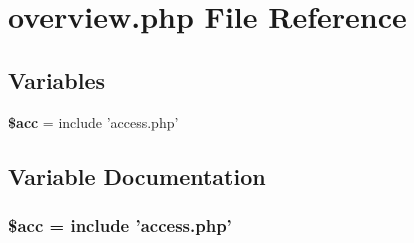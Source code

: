\section{overview.php File Reference}
\label{overview_8php}


\subsection*{Variables}
\begin{CompactItemize}
\item 
{\bf \$acc} = include 'access.php'
\end{CompactItemize}


\subsection{Variable Documentation}
\subsubsection{\setlength{\rightskip}{0pt plus 5cm}\$acc = include 'access.php'}\label{overview_8php_542926c588a05eb69553d79c83cf73da}


